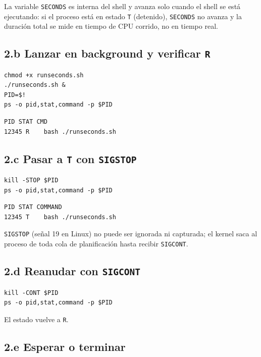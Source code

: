 \documentclass[11pt,a4paper]{article}
\begin{document}
La variable \texttt{SECONDS} es interna del shell y avanza solo cuando
el shell se está ejecutando: si el proceso está en estado \texttt{T}
(detenido), \texttt{SECONDS} no avanza y la duración total se mide en
tiempo de CPU corrido, no en tiempo real.

\subsection*{2.b Lanzar en background y verificar \texttt{R}}

\begin{lstlisting}
chmod +x runseconds.sh
./runseconds.sh &
PID=$!
ps -o pid,stat,command -p $PID
\end{lstlisting}

\begin{lstlisting}[style=textstyle]
  PID STAT CMD
12345 R    bash ./runseconds.sh
\end{lstlisting}

\subsection*{2.c Pasar a \texttt{T} con \texttt{SIGSTOP}}

\begin{lstlisting}
kill -STOP $PID
ps -o pid,stat,command -p $PID
\end{lstlisting}

\begin{lstlisting}[style=textstyle]
  PID STAT COMMAND
12345 T    bash ./runseconds.sh
\end{lstlisting}

\texttt{SIGSTOP} (señal 19 en Linux) no puede ser ignorada ni capturada;
el kernel saca al proceso de toda cola de planificación hasta recibir
\texttt{SIGCONT}.

\subsection*{2.d Reanudar con \texttt{SIGCONT}}

\begin{lstlisting}
kill -CONT $PID
ps -o pid,stat,command -p $PID
\end{lstlisting}

El estado vuelve a \texttt{R}.

\subsection*{2.e Esperar o terminar}
\end{document}

